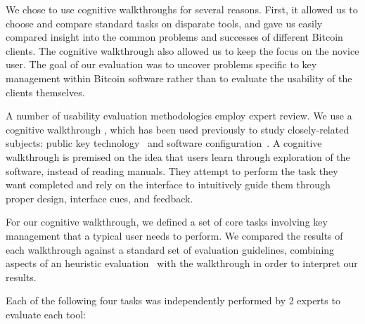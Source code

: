 We chose to use cognitive walkthroughs for several reasons. First, it allowed us to choose and compare standard tasks on disparate tools, and gave us easily compared insight into the common problems and successes of different Bitcoin clients. The cognitive walkthrough also allowed us to keep the focus on the novice user. The goal of our evaluation was to uncover problems specific to key management within Bitcoin software rather than to evaluate the usability of the clients themselves.


A number of usability evaluation methodologies employ expert review. We use a cognitive walkthrough \cite{WRLP94}, which has been used previously to study closely-related subjects: public key technology~\cite{WT99} and software configuration~\cite{COA07}. A cognitive walkthrough is premised on the idea that users learn through exploration of the software, instead of reading manuals. They attempt to perform the task they want completed and rely on the interface to intuitively guide them through proper design, interface cues, and feedback. 

For our cognitive walkthrough, we defined a set of core tasks involving key management that a typical user needs to perform. We compared the results of each walkthrough against a standard set of evaluation guidelines, combining aspects of an heuristic evaluation~\cite{HeuristicEvaluation} with the walkthrough in order to interpret our results. 

Each of the following four tasks was independently performed by 2 experts to evaluate each tool:


